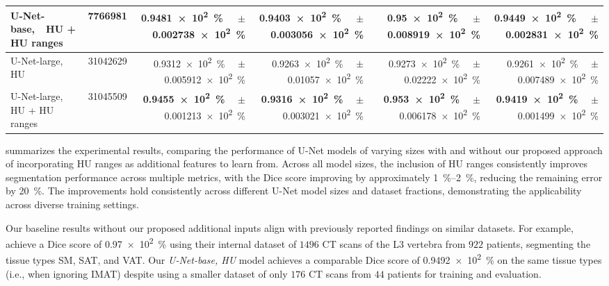 \documentclass[conference]{IEEEtran}
\newcommand\formatpercentage[2][round-precision = 1]{%
    \SI[round-mode = places,
        scientific-notation = fixed, fixed-exponent = 0,
        output-decimal-marker={.}, #1]{#2e2}{\percent}%
}
\newcommand\formatpercentagebold[2][round-precision = 1]{%
    \textbf{\SI[round-mode = places,
        scientific-notation = fixed, fixed-exponent = 0,
        output-decimal-marker={.}, #1]{#2e2}{\percent}}%
}
\begin{document}
\begin{table}[t]
\begin{tabular}{lrrrrr}
        U-Net-base,\ \ HU + HU ranges                        
        & \num{7766981} 
        & \formatpercentagebold{0.9481}\ \ $\pm$\formatpercentage{0.002738} 
        & \formatpercentagebold{0.9403}\ \ $\pm$\formatpercentage{0.003056}
        & \formatpercentagebold{0.95}\ \ $\pm$\formatpercentage{0.008919}
        & \formatpercentagebold{0.9449}\ \ $\pm$\formatpercentage{0.002831}  \\
        \midrule
        U-Net-large, HU                                   
        & \num{31042629} 
        & \formatpercentage{0.9312}\ \ $\pm$\formatpercentage{0.005912} 
        & \formatpercentage{0.9263}\ \ $\pm$\formatpercentage{0.01057} 
        & \formatpercentage{0.9273}\ \ $\pm$\formatpercentage{0.02222}
        & \formatpercentage{0.9261}\ \ $\pm$\formatpercentage{0.007489} \\
        U-Net-large, HU + HU ranges                       
        & \num{31045509}          
        & \formatpercentagebold{0.9455}\ \ $\pm$\formatpercentage{0.001213} 
        & \formatpercentagebold{0.9316}\ \ $\pm$\formatpercentage{0.003021} 
        & \formatpercentagebold{0.953}\ \ $\pm$\formatpercentage{0.006178} 
        & \formatpercentagebold{0.9419}\ \ $\pm$\formatpercentage{0.001499}  \\
        \bottomrule
    \end{tabular}
    \label{tab:results} \label{tbl:results}
\end{table}

 summarizes the experimental results, comparing the performance of U-Net models of varying sizes with and without our proposed approach of incorporating HU ranges as additional features to learn from.
Across all model sizes, the inclusion of HU ranges consistently improves segmentation performance across multiple metrics, with the Dice score improving by approximately \SIrange{1}{2}{\percent}, reducing the remaining error by \SI{20}{\percent}. 
The improvements hold consistently across different U-Net model sizes and dataset fractions, demonstrating the applicability across diverse training settings.

Our baseline results without our proposed additional inputs align with previously reported findings on similar datasets.
For example, \cite{ha_development_2021} achieve a Dice score of \formatpercentage[round-precision=0]{0.97} using their internal dataset of $1496$ CT scans of the L3 vertebra from $922$ patients, segmenting the tissue types SM, SAT, and VAT.
Our \emph{U-Net-base, HU} model achieves a comparable Dice score of \formatpercentage[round-precision=0]{0.9492} on the same tissue types (i.e., when ignoring IMAT) despite using a smaller dataset of only $176$ CT scans from $44$ patients for training and evaluation.
\end{document}
